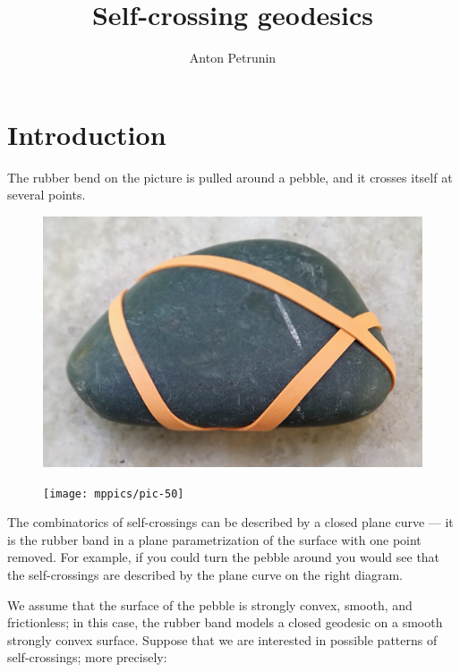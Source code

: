 \documentclass[oneside,a4paper]{amsart}
\begin{document}


\title{Self-crossing geodesics}
\author{Anton Petrunin}
\maketitle

\section{Introduction}


The rubber bend on the picture is pulled around a pebble,
and it crosses itself at several points.
\begin{figure}[!ht]
\hfill
\begin{minipage}{.56\textwidth}
\centering
\includegraphics[width=\textwidth]{pics/pebble.jpg}
\end{minipage}
\hfill
\begin{minipage}{.30\textwidth}
\centering
\texttt{[image: mppics/pic-50]}
\end{minipage}
\hfill
\end{figure}
The combinatorics of self-crossings can be described by a closed plane curve --- it is the rubber band in a plane parametrization of the surface with one point removed.
For example, if you could turn the pebble around you would see that the self-crossings are described by the plane curve on the right diagram.

We assume that the surface of the pebble is strongly convex, smooth, and frictionless;
in this case, the rubber band models a closed geodesic on a smooth strongly convex surface.
Suppose that we are interested in possible patterns of self-crossings; more precisely:
\end{document}
